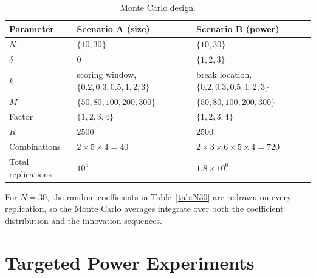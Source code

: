 \documentclass[12pt]{article}
\begin{document}
\begin{table}[h]
\centering
\caption{Monte Carlo design.}
\label{tab:design}
\begin{tabular}{lll}
\toprule
Parameter & Scenario A (size) & Scenario B (power) \\
\midrule
$N$ & $\{10,30\}$ & $\{10,30\}$ \\
$\delta$ & $0$ & $\{1,2,3\}$ \\
$k$ & scoring window, $\{0.2,0.3,0.5,1,2,3\}$ & break location, $\{0.2,0.3,0.5,1,2,3\}$ \\
$M$ & $\{50,80,100,200,300\}$ & $\{50,80,100,200,300\}$ \\
Factor & $\{1,2,3,4\}$ & $\{1,2,3,4\}$ \\
$R$ & $2500$ & $2500$ \\
\midrule
Combinations & $2\times5\times4 = 40$ & $2\times3\times6\times5\times4 = 720$ \\
Total replications & $10^5$ & $1.8\times10^6$ \\
\bottomrule
\end{tabular}
\end{table}

For $N=30$, the random coefficients in Table~\ref{tab:N30} are redrawn on
every replication, so the Monte Carlo averages integrate over both the
coefficient distribution and the innovation sequences.

\section{Targeted Power Experiments}
\label{sec:targeted}
\end{document}
